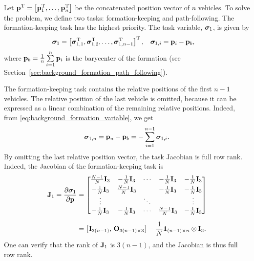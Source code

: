 Let $\mathbf{p}^{\mathrm{T}} = \left[\mathbf{p}_1^{\mathrm{T}}, \ldots, \mathbf{p}_n^{\mathrm{T}}\right]$ be the concatenated position vector of $n$ vehicles.
To solve the problem, we define two tasks: formation-keeping and path-following.
The formation-keeping task has the highest priority.
The task variable, $\bm{\sigma}_1$, is given by
\begin{align}
    \bm{\sigma}_1 &= \left[\bm{\sigma}_{1, 1}^{\mathrm{T}}, \bm{\sigma}_{1, 2}^{\mathrm{T}}, \ldots, \bm{\sigma}_{1, n-1}^{\mathrm{T}}\right]^{\mathrm{T}}, &
    \bm{\sigma}_{1, i} &= \mathbf{p}_i - \mathbf{p}_b,
    \label{eq:background_formation_variable}
\end{align}
where $\mathbf{p}_b = \frac{1}{n}\sum\limits_{i=1}^n \mathbf{p}_i$ is the barycenter of the formation (see Section~\ref{sec:background_formation_path_following}).

\begin{rmk}
    The formation-keeping task contains the relative positions of the first $n-1$ vehicles.
    The relative position of the last vehicle is omitted, because it can be expressed as a linear combination of the remaining relative positions.
    Indeed, from \eqref{eq:background_formation_variable}, we get
    \begin{equation}
        \bm{\sigma}_{1, n} = \mathbf{p}_n - \mathbf{p}_b = - \sum_{i=1}^{n-1} \bm{\sigma}_{1, i}.
    \end{equation}
    By omitting the last relative position vector, the task Jacobian is full row rank.
    Indeed, the Jacobian of the formation-keeping task is
    \begin{equation}
        \begin{split}
            \mathbf{J}_1 = \frac{\partial \bm{\sigma}_1}{\partial \mathbf{p}} &= 
            \begin{bmatrix}
                \frac{N-1}{N} \mathbf{I}_3 & -\frac{1}{N} \mathbf{I}_3 & \cdots & -\frac{1}{N} \mathbf{I}_3 & -\frac{1}{N} \mathbf{I}_3 \\[3pt]
                -\frac{1}{N} \mathbf{I}_3 & \frac{N-1}{N} \mathbf{I}_3 & & -\frac{1}{N} \mathbf{I}_3 & -\frac{1}{N} \mathbf{I}_3 \\ 
                \vdots & & \ddots & & \vdots \\
                -\frac{1}{N} \mathbf{I}_3 & -\frac{1}{N} \mathbf{I}_3 & \cdots & \frac{N-1}{N} \mathbf{I}_3 & -\frac{1}{N} \mathbf{I}_3
            \end{bmatrix} \\[6pt]
            &= \left[\mathbf{I}_{3(n-1)},\, \mathbf{O}_{3(n-1) \times 3}\right] - \frac{1}{N} \mathbf{1}_{(n-1) \times n} \otimes \mathbf{I}_3.
        \end{split}
    \end{equation}
    One can verify that the rank of $\mathbf{J}_1$ is $3(n-1)$, and the Jacobian is thus full row rank.
\end{rmk}

